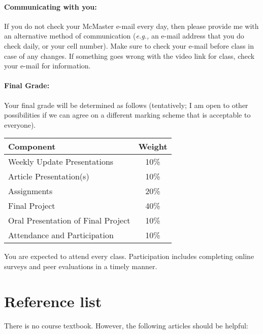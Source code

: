 \documentclass[12pt]{article}
\begin{document}
\paragraph*{Communicating with you:}

If you do not check your McMaster e-mail every day, then please
provide me with an alternative method of communication (\emph{e.g.,}
an e-mail address that you do check daily, or your cell number).  Make
sure to check your e-mail before class in case of any changes.  If
something goes wrong with the video link for class, check your e-mail
for information.

\paragraph*{Final Grade:}
Your final grade will be determined as follows (tentatively; I am open
to other possibilities if we can agree on a different marking scheme
that is acceptable to everyone).
%
\begin{center}
\begin{tabular}{l|c}
\bf Component & \bf Weight \\\hline
Weekly Update Presentations & 10\% \\
Article Presentation(s) & 10\% \\
Assignments & 20\% \\
Final Project & 40\% \\
Oral Presentation of Final Project & 10\% \\
Attendance and Participation & 10\% \\
\end{tabular}
\end{center}
\noindent You are expected to attend every class.  Participation
includes completing online surveys and peer evaluations in a timely
manner.

\section*{Reference list}
There is no course textbook.  However, the following articles should be helpful:
\end{document}
